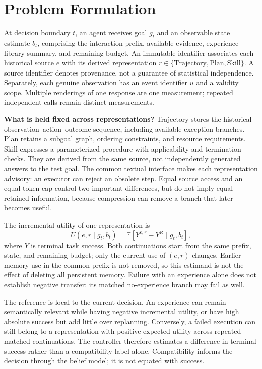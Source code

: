 \documentclass[sigconf,anonymous,review]{acmart}
\newcommand{\E}{\mathbb{E}}
\theoremstyle{zhplain}
\begin{document}
\section{Problem Formulation}
\label{sec:problem}
At decision boundary \(t\), an agent receives goal \(g_t\) and an observable state estimate \(b_t\), comprising the interaction prefix, available evidence, experience-library summary, and remaining budget. An immutable identifier associates each historical source \(e\) with its derived representation \(r\in\{\mathrm{Trajectory},\mathrm{Plan},\mathrm{Skill}\}\). A source identifier denotes provenance, not a guarantee of statistical independence. Separately, each genuine observation has an event identifier \(u\) and a validity scope. Multiple renderings of one response are one measurement; repeated independent calls remain distinct measurements.

\textbf{What is held fixed across representations?} Trajectory stores the historical observation--action--outcome sequence, including available exception branches. Plan retains a subgoal graph, ordering constraints, and resource requirements. Skill expresses a parameterized procedure with applicability and termination checks. They are derived from the same source, not independently generated answers to the test goal. The common textual interface makes each representation advisory: an executor can reject an obsolete step. Equal source access and an equal token cap control two important differences, but do not imply equal retained information, because compression can remove a branch that later becomes useful.

The incremental utility of one representation is
\begin{equation}
U(e,r\mid g_t,b_t)=\E[Y^{e,r}-Y^{\varnothing}\mid g_t,b_t],
\label{eq:utility}
\end{equation}
where \(Y\) is terminal task success. Both continuations start from the same prefix, state, and remaining budget; only the current use of \((e,r)\) changes. Earlier memory use in the common prefix is not removed, so this estimand is not the effect of deleting all persistent memory. Failure with an experience alone does not establish negative transfer: its matched no-experience branch may fail as well.

The reference is local to the current decision. An experience can remain semantically relevant while having negative incremental utility, or have high absolute success but add little over replanning. Conversely, a failed execution can still belong to a representation with positive expected utility across repeated matched continuations. The controller therefore estimates a difference in terminal success rather than a compatibility label alone. Compatibility informs the decision through the belief model; it is not equated with success.
\end{document}
